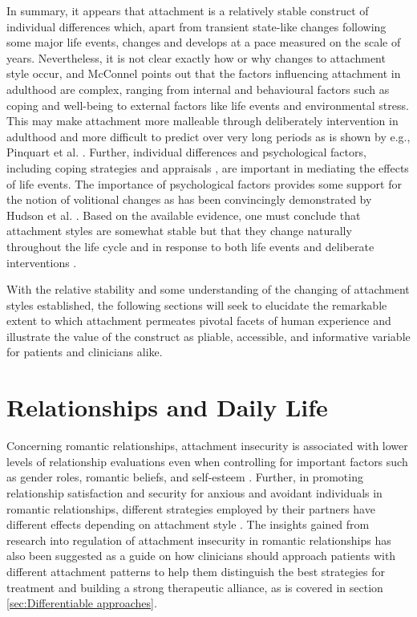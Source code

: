 \documentclass[12pt]{report}
\begin{document}
In summary, it appears that attachment is a relatively stable construct of individual differences which, apart from transient state-like changes following some major life events, changes and develops at a pace measured on the scale of years.
Nevertheless, it is not clear exactly how or why changes to attachment style occur, and McConnel \citeyear{McConnell2011} points out that the factors influencing attachment in adulthood are complex, ranging from internal and behavioural factors such as coping and well-being to external factors like life events and environmental stress.
This may make attachment more malleable through deliberately intervention in adulthood and more difficult to predict over very long periods as is shown by e.g., Pinquart et al. \citeyear{Pinquart2013}.
Further, individual differences and psychological factors, including coping strategies \cite{Zhang2004} and appraisals , are important in mediating the effects of life events. The importance of psychological factors provides some support for the notion of volitional changes as has been convincingly demonstrated by Hudson et al. \citeyear{Hudson2020}.
Based on the available evidence, one must conclude that attachment styles are somewhat stable but that they change naturally throughout the life cycle \cite{Rowe2005,Doherty2004,Fraley1997} and in response to both life events \cite{Fraley2021} and deliberate interventions \cite{Hudson2020}.

With the relative stability and some understanding of the changing of attachment styles established, the following sections will seek to elucidate the remarkable extent to which attachment permeates pivotal facets of human experience and illustrate the value of the construct as pliable, accessible, and informative variable for patients and clinicians alike.

\section{Relationships and Daily Life}
Concerning romantic relationships, attachment insecurity is associated with lower levels of relationship evaluations even when controlling for important factors such as gender roles, romantic beliefs, and self-esteem .
Further, in promoting relationship satisfaction and security for anxious and avoidant individuals in romantic relationships, different strategies employed by their partners have different effects depending on attachment style \cite{Overall2015}.
The insights gained from research into regulation of attachment insecurity in romantic relationships has also been suggested as a guide on how clinicians should approach patients with different attachment patterns to help them distinguish the best strategies for treatment and building a strong therapeutic alliance, as is covered in section \ref{sec:Differentiable approaches}.
\end{document}
